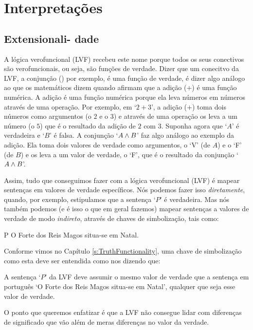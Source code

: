 \part{Interpretações}
\label{ch.semantics}


\chapter[Extensionalidade]{Extensionali- dade}\label{s:Interpretations}

A lógica verofuncional (LVF) recebeu este nome porque todos os seus conectivos são verofuncionais, ou seja, são funções de verdade.
Dizer que um conecitvo da LVF, a conjunção (\eand) por exemplo, é uma função de verdade, é dizer algo análogo ao que os matemáticos dizem quando afirmam que a adição ($+$) é uma função numérica.
A adição é uma função numérica porque ela leva números em números através de uma operação.
Por exemplo, em  `$2+3$', a adição ($+$) toma dois números como argumentos (o $2$ e o $3$) e através de uma operação os leva a um número (o $5$) que é o resultado da adição de $2$ com $3$.
Suponha agora que `$A$' é verdadeira e `$B$' é falsa. A conjunção `$A\wedge B$' faz algo análogo ao exemplo da adição.
Ela toma dois valores de verdade como argumentos, o `V' (de $A$) e o `F' (de $B$) e os leva a um valor de verdade, o `F', que é o resultado da conjunção `$A\wedge B$'.

Assim, tudo que conseguimos fazer com a lógica verofuncional (LVF) é mapear sentenças em valores de verdade específicos.
Nós podemos fazer isso \emph{diretamente}, quando, por exemplo, estipulamos que a sentença `$P$' é verdadeira.
Mas nós também podemos (e é isso o que em geral fazemos) mapear sentenças a valores de verdade de modo \emph{indireto}, através de chaves de simbolização, tais como:
	\begin{ekey}
		\item[P] O Forte dos Reis Magos situa-se em Natal.
	\end{ekey}
Conforme vimos no Capítulo \ref{s:TruthFunctionality}, uma chave de simbolização como esta deve ser entendida como nos dizendo que:
	\begin{ebullet}
		\item A sentença `$P$' da LVF deve assumir o mesmo valor de verdade que a sentença em português `O Forte dos Reis Magos situa-se em Natal', qualquer que seja esse valor de verdade.
	\end{ebullet}
O ponto que queremos enfatizar é que a LVF não consegue lidar com diferenças de significado que vão além de meras diferenças no valor da verdade.


